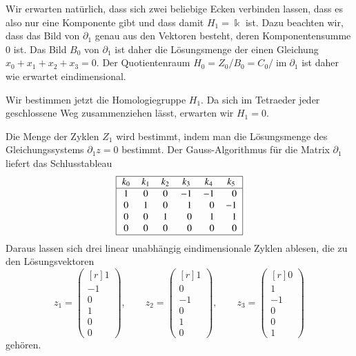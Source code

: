 \begin{beispiel}
Wir erwarten natürlich, dass sich zwei beliebige Ecken verbinden lassen,
dass es also nur eine Komponente gibt und dass damit $H_1=\Bbbk$ ist.
Dazu beachten wir, dass das Bild von $\partial_1$ genau aus den Vektoren
besteht, deren Komponentensumme $0$ ist.
Das Bild $B_0$ von $\partial_1$ ist daher die Lösungsmenge der einen
Gleichung
\(
x_0+x_1+x_2+x_3=0.
\)
Der Quotientenraum $H_0=Z_0/B_0 = C_0/\operatorname{im}\partial_1$
ist daher wie erwartet eindimensional.

Wir bestimmen jetzt die Homologiegruppe $H_1$.
Da sich im Tetraeder jeder geschlossene Weg zusammenziehen lässt,
erwarten wir $H_1=0$.

Die Menge der Zyklen $Z_1$ wird bestimmt, indem man die Lösungsmenge
des Gleichungssystems $\partial_1z=0$ bestimmt.
Der Gauss-Algorithmus für die Matrix $\partial_1$ liefert das
Schlusstableau
\[
\begin{tabular}{|>{$}c<{$}>{$}c<{$}>{$}c<{$}>{$}c<{$}>{$}c<{$}>{$}c<{$}|}
\hline
k_0&k_1&k_2&k_3&k_4&k_5\\
\hline
   1&  0&  0& -1& -1& \phantom{-}0\\
   0&  1&  0&  \phantom{-}1&  \phantom{-}0& -1\\
   0&  0&  1&  \phantom{-}0&  \phantom{-}1&  \phantom{-}1\\
   0&  0&  0&  \phantom{-}0&  \phantom{-}0&  \phantom{-}0\\
\hline
\end{tabular}
\]
Daraus lassen sich drei linear unabhängig eindimensionale Zyklen ablesen,
die zu den Lösungsvektoren
\[
z_1
=
\begin{pmatrix*}[r]
1\\
-1\\
0\\
1\\
0\\
0
\end{pmatrix*},
\qquad
z_2
=
\begin{pmatrix*}[r]
1\\
0\\
-1\\
0\\
1\\
0
\end{pmatrix*},
\qquad
z_3
=
\begin{pmatrix*}[r]
0\\
1\\
-1\\
0\\
0\\
1
\end{pmatrix*}
\]
gehören.


\end{beispiel}
